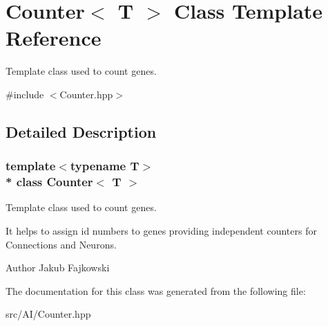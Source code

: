 \hypertarget{classCounter}{}\section{Counter$<$ T $>$ Class Template Reference}
\label{classCounter}


Template class used to count genes.  




{\ttfamily \#include $<$Counter.\+hpp$>$}



\subsection{Detailed Description}
\subsubsection*{template$<$typename T$>$\\*
class Counter$<$ T $>$}

Template class used to count genes. 

It helps to assign id numbers to genes providing independent counters for Connections and Neurons. \begin{DoxyAuthor}{Author}
Jakub Fajkowski 
\end{DoxyAuthor}


The documentation for this class was generated from the following file\+:\begin{DoxyCompactItemize}
\item 
src/\+A\+I/Counter.\+hpp\end{DoxyCompactItemize}
